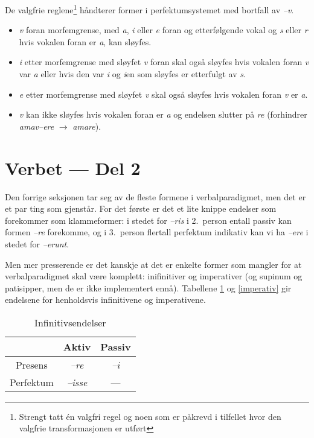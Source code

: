 \documentclass[a4paper]{article}
\begin{document}
De valgfrie reglene\footnote{Strengt tatt \'en valgfri regel og noen som er
p\aa{}krevd i tilfellet hvor den valgfrie transformasjonen er utf\o{}rt}
h\aa{}ndterer former i perfektumsystemet med bortfall av \emph{--v}.

\begin{itemize}
\item \emph{v} foran morfemgrense, med \emph{a}, \emph{i} eller \emph{e} foran
og etterf\o{}lgende vokal og \emph{s} eller \emph{r} hvis vokalen foran er
\emph{a}, kan sl\o{}yfes.

\item \emph{i} etter morfemgrense med sl\o{}yfet \emph{v} foran skal ogs\aa{}
sl\o{}yfes hvis vokalen foran \emph{v} var \emph{a} eller hvis den var
\emph{i} og \emph{i}en som sl\o{}yfes er etterfulgt av \emph{s}.

\item \emph{e} etter morfemgrense med sl\o{}yfet \emph{v} skal ogs\aa{}
sl\o{}yfes hvis vokalen foran \emph{v} er \emph{a}.

\item \emph{v} kan ikke sl\o{}yfes hvis vokalen foran er \emph{a} og endelsen
slutter p\aa{} \emph{re} (forhindrer \emph{amav--ere} $\to$ \emph{amare}).
\end{itemize}

\section{Verbet --- Del 2}
Den forrige seksjonen tar seg av de fleste formene i verbalparadigmet, men det
er et par ting som gjenst\aa{}r. For det f\o{}rste er det et lite knippe
endelser som forekommer som klammeformer: i stedet for \emph{--ris} i
2.~person entall passiv kan formen \emph{--re} forekomme, og i 3.~person
flertall perfektum indikativ kan vi ha \emph{--ere} i stedet for
\emph{--erunt}.

Men mer presserende er det kanskje at det er enkelte former som mangler for at
verbalparadigmet skal v\ae{}re komplett: inifinitiver og imperativer (og
supinum og patisipper, men de er ikke implementert enn\aa{}). Tabellene
\ref{infinitiv} og \ref{imperativ} gir endelsene for henholdsvis infinitivene
og imperativene.

\begin{table}[hp]
\begin{center}
\begin{tabular}{|c|c|c|}
    \hline
          & Aktiv        & Passiv \\
    \hline
Presens   & \emph{--re}  & \emph{--i} \\
Perfektum & \emph{--isse} & --- \\
    \hline
\end{tabular}
\caption{Infinitivsendelser}
\label{infinitiv}
\end{center}
\end{table}
\end{document}
